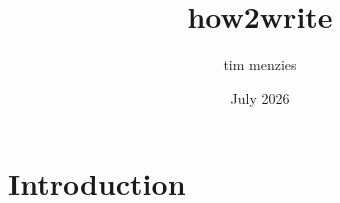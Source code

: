 \documentclass{article}
\title{how2write}
\author{tim menzies}
\date{July 2026}
\begin{document}
\maketitle

\section{Introduction}
\end{document}
